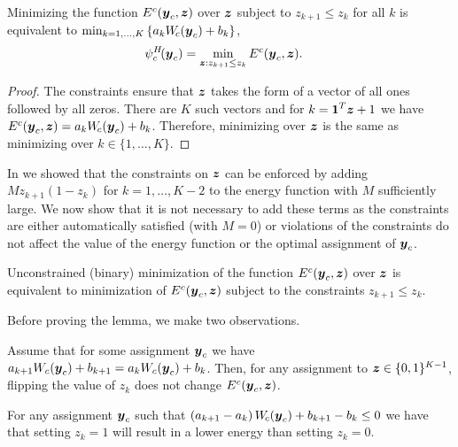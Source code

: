\documentclass[10pt,journal,letterpaper,compsoc]{IEEEtran}
\renewcommand{\citename}{\citet}
\begin{document}
\begin{proposition}
\label{prop:minpsi}
Minimizing the function $E^c({\boldsymbol{y}}_c, {\boldsymbol{z}})$ over ${\boldsymbol{z}}$ subject to
$z_{k+1} \leq z_k$ for all $k$ is equivalent to $\min_{k=1, \ldots, K}
\left\{ a_k W_{\!c}({\boldsymbol{y}}_c) + b_k \right\}$, \ie
\begin{align*}
  \psi^H_c\!({\boldsymbol{y}}_c) &= \min_{{\boldsymbol{z}} : z_{k+1} \leq z_k} E^c({\boldsymbol{y}}_c, {\boldsymbol{z}}).
\end{align*}
\end{proposition}
%
\begin{proof}
  The constraints ensure that ${\boldsymbol{z}}$ takes the form of a vector of all
  ones followed by all zeros. There are $K$ such vectors and for $k =
  \textbf{1}^T {\boldsymbol{z}} + 1$ we have $E^c({\boldsymbol{y}}_c, {\boldsymbol{z}}) = a_k W_{\!c}({\boldsymbol{y}}_c) +
  b_k$. Therefore, minimizing over ${\boldsymbol{z}}$ is the same as minimizing
  over $k \in \{1, \ldots, K\}$.
\end{proof}
\bigskip

In \citename{Gould:ICML2011} we showed that the constraints on ${\boldsymbol{z}}$
can be enforced by adding $M z_{k+1} (1 - z_k)$ for $k = 1, \ldots,
K-2$ to the energy function with $M$ sufficiently large. We now show
that it is not necessary to add these terms as the constraints are
either automatically satisfied (with $M = 0$) or violations of the
constraints do not affect the value of the energy function or the
optimal assignment of ${\boldsymbol{y}}_c$.

\begin{lemma}
Unconstrained (binary) minimization of the function $E^c({\boldsymbol{y}}_c, {\boldsymbol{z}})$
over ${\boldsymbol{z}}$ is equivalent to minimization of $E^c({\boldsymbol{y}}_c, {\boldsymbol{z}})$ subject
to the constraints $z_{k+1} \leq z_k$.
\label{lem:noconstraints}
\end{lemma}

Before proving the lemma, we make two observations.

\begin{observation}
  Assume that for some assignment ${\boldsymbol{y}}_c$ we have $a_{k+1} W_c({\boldsymbol{y}}_c) +
  b_{k+1} = a_{k} W_c({\boldsymbol{y}}_c) + b_{k}$. Then, for any assignment to ${\boldsymbol{z}}
  \in \{0, 1\}^{K-1}$, flipping the value of $z_k$ does not change
  $E^c({\boldsymbol{y}}_c, {\boldsymbol{z}})$.
\end{observation}

\begin{observation}
  For any assignment ${\boldsymbol{y}}_c$ such that $\left(a_{k+1} - a_{k}\right)
  W_{\!c}({\boldsymbol{y}}_c) + b_{k+1} - b_k \leq 0$ we have that setting $z_k = 1$ will
  result in a lower energy than setting $z_k = 0$.
\end{observation}
\end{document}

